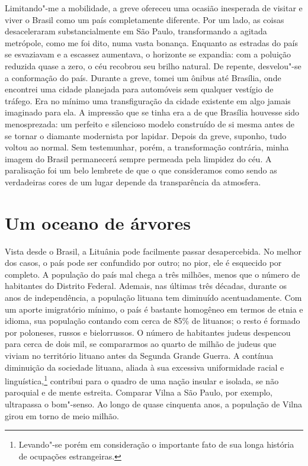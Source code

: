 Limitando"-me a
mobilidade, a greve ofereceu uma ocasião inesperada de visitar e viver o
Brasil como um país completamente diferente. Por um lado, as coisas
desaceleraram substancialmente em São Paulo, transformando a agitada
metrópole, como me foi dito, numa vasta bonança. Enquanto as estradas
do país se esvaziavam e a escassez aumentava, o horizonte se expandia:
com a poluição reduzida quase a zero, o céu recobrou seu brilho natural.
De repente, desvelou"-se a conformação do país. Durante a greve, tomei um
ônibus até Brasília, onde encontrei uma cidade planejada para automóveis
sem qualquer vestígio de tráfego. Era no mínimo uma transfiguração da
cidade existente em algo jamais imaginado para ela. A impressão que se
tinha era a de que Brasília houvesse sido menosprezada: um perfeito e
silencioso modelo construído de si mesma antes de se tornar o diamante
modernista por lapidar. Depois da greve, suponho, tudo voltou ao normal.
Sem testemunhar, porém, a transformação contrária, minha imagem do
Brasil permanecerá sempre permeada pela limpidez do céu. A paralisação
foi um belo lembrete de que o que consideramos como sendo as verdadeiras
cores de um lugar depende da transparência da atmosfera.

\section*{Um oceano de árvores}

Vista desde o Brasil, a Lituânia pode facilmente passar desapercebida.
No melhor dos casos, o país pode ser confundido por outro; no pior, ele
é esquecido por completo. A população do país mal chega a três milhões,
menos que o número de habitantes do Distrito Federal. Ademais, nas
últimas três décadas, durante os anos de independência, a população
lituana tem diminuído acentuadamente. Com um aporte imigratório mínimo,
o país é bastante homogêneo em termos de etnia e idioma, sua população
contando com cerca de 85\% de lituanos; o resto é
formado por poloneses, russos e bielorrussos. O número de habitantes
judeus despencou para cerca de dois mil, se compararmos ao quarto de
milhão de judeus que viviam no território lituano antes da Segunda
Grande Guerra. A contínua diminuição da sociedade lituana, aliada à sua
excessiva uniformidade racial e linguística,\footnote{Levando"-se porém em
consideração o importante fato de sua longa história de ocupações
estrangeiras.} contribui para o quadro de uma nação insular e isolada,
se não paroquial e de mente estreita. Comparar Vilna a São Paulo, por
exemplo, ultrapassa o bom"-senso. Ao longo de quase cinquenta anos, a
população de Vilna girou em torno de meio milhão. 

